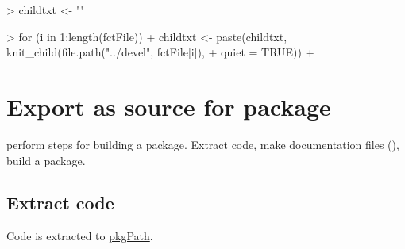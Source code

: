 \documentclass[a4paper,12pt]{article}\usepackage[]{graphicx}\usepackage[]{color}
\begin{document}
\clearpage
\begin{Schunk}
\begin{Sinput}
> childtxt <- ""
\end{Sinput}
\end{Schunk}
\begin{Schunk}
\begin{Sinput}
> for (i in 1:length(fctFile)) {
+     childtxt <- paste(childtxt, knit_child(file.path("../devel", fctFile[i]), 
+         quiet = TRUE))
+ }
\end{Sinput}
\end{Schunk}

\clearpage
\section{Export as source for package}

perform steps for building a package. Extract code, make documentation files (), build a package.

\subsection{Extract code}

Code is extracted to \url{pkgPath}.
\end{document}
